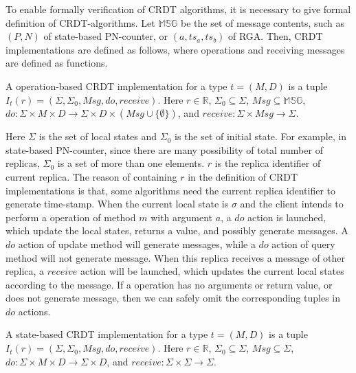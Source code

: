 {To enable formally verification of CRDT algorithms, it is necessary to give formal definition of CRDT-algorithms. Let $\mathbb{MSG}$ be the set of message contents, such as $(P,N)$ of state-based PN-counter, or $(a,ts_a,ts_b)$ of RGA. Then, CRDT implementations are defined as follows, where operations and receiving messages are defined as functions.

\begin{definition}
\label{definition:operation-based CRDT implementations}
A operation-based CRDT implementation for a type $t = (M,D)$ is a tuple $I_t(r) = (\Sigma, \Sigma_0, \mathit{Msg}, \mathit{do},\mathit{receive})$. Here $r \in \mathbb{R}$, $\Sigma_0 \subseteq \Sigma$, $\mathit{Msg} \subseteq \mathbb{MSG}$, $\mathit{do}:\Sigma \times M \times D \rightarrow \Sigma \times D \times (\mathit{Msg} \cup \{ \emptyset \} )$, and $\mathit{receive}: \Sigma \times \mathit{Msg} \rightarrow \Sigma$.
\end{definition}

Here $\Sigma$ is the set of local states and $\Sigma_0$ is the set of initial state. For example, in state-based PN-counter, since there are many possibility of total number of replicas, $\Sigma_0$ is a set of more than one elements. $r$ is the replica identifier of current replica. The reason of containing $r$ in the definition of CRDT implementations is that, some algorithms need the current replica identifier to generate time-stamp. When the current local state is $\sigma$ and the client intends to perform a operation of method $m$ with argument $a$, a $\mathit{do}$ action is launched, which update the local states, returns a value, and possibly generate messages. A $\mathit{do}$ action of update method will generate messages, while a $\mathit{do}$ action of query method will not generate message. When this replica receives a message of other replica, a $\mathit{receive}$ action will be launched, which updates the current local states according to the message. If a operation has no arguments or return value, or does not generate message, then we can safely omit the corresponding tuples in $\mathit{do}$ actions.

\begin{definition}
\label{definition:state-based CRDT implementations}
A state-based CRDT implementation for a type $t = (M,D)$ is a tuple $I_t(r) = (\Sigma, \Sigma_0, \mathit{Msg}, \mathit{do},\mathit{receive})$. Here $r \in \mathbb{R}$, $\Sigma_0 \subseteq \Sigma$, $\mathit{Msg} \subseteq \Sigma$, $\mathit{do}:\Sigma \times M \times D \rightarrow \Sigma \times D$, and $\mathit{receive}: \Sigma \times \Sigma \rightarrow \Sigma$.
\end{definition}

}
